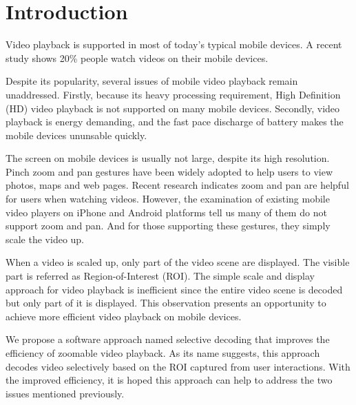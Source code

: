 \section{Introduction}
Video playback is supported in most of today's typical mobile devices. A recent study shows 20\% people watch videos on their mobile devices\cite{webbusinessinsider}.

Despite its popularity, several issues of mobile video playback remain unaddressed. Firstly, because its heavy processing requirement, High Definition (HD) video playback is not supported on many mobile devices. Secondly, video playback is energy demanding, and the fast pace discharge of battery makes the mobile devices ununsable quickly. 

The screen on mobile devices is usually not large, despite its high resolution. Pinch zoom and pan gestures have been widely adopted to help users to view photos, maps and web pages. Recent research indicates zoom and pan are helpful for users when watching videos\cite{Khiem:2011:TUU:2072298.2071917}. However, the examination of existing mobile video players on iPhone and Android platforms tell us many of them do not support zoom and pan. And for those supporting these gestures, they simply scale the video up.

When a video is scaled up, only part of the video scene are displayed. The visible part is referred as Region-of-Interest (ROI). The simple scale and display approach for video playback is inefficient since the entire video scene is decoded but only part of it is displayed. This observation presents an opportunity to achieve more efficient video playback on mobile devices. 

We propose a software approach named selective decoding that improves the efficiency of zoomable video playback. As its name suggests, this approach decodes video selectively based on the ROI captured from user interactions. With the improved efficiency, it is hoped this approach can help to address the two issues mentioned previously.

